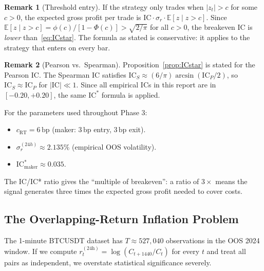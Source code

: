 \documentclass[12pt, a4paper]{article}
\theoremstyle{plain}
\theoremstyle{definition}
\newtheorem{remark}{Remark}[section]
\newcommand{\IC}{\mathrm{IC}}
\newcommand{\E}{\mathbb{E}}
\newcommand{\bp}{\,\mathrm{bp}}
\begin{document}
\begin{remark}[Threshold entry]
  If the strategy only trades when $|z_t| > c$ for some $c > 0$, the expected
  gross profit per trade is $\IC \cdot \sigma_r \cdot \E[z \mid z > c]$.  Since
  $\E[z \mid z > c] = \phi(c)/[1-\Phi(c)] > \sqrt{2/\pi}$ for all $c > 0$,
  the breakeven IC is \emph{lower} than~\eqref{eq:ICstar}.  The formula as
  stated is conservative: it applies to the strategy that enters on every bar.
\end{remark}

\begin{remark}[Pearson vs.\ Spearman]
  Proposition~\ref{prop:ICstar} is stated for the Pearson IC.  The Spearman
  IC satisfies $\IC_S \approx (6/\pi)\arcsin(\IC_P / 2)$, so
  $\IC_S \approx \IC_P$ for $|\IC| \ll 1$.  Since all empirical ICs in this
  report are in $[-0.20, +0.20]$, the same $\IC^*$ formula is applied.
\end{remark}

For the parameters used throughout Phase 3:
\begin{itemize}[noitemsep]
  \item $c_{\mathrm{RT}} = 6\bp$ (maker: $3\bp$ entry, $3\bp$ exit).
  \item $\sigma_r^{(24h)} \approx 2.135\%$ (empirical OOS volatility).
  \item $\IC^*_{\mathrm{maker}} \approx 0.035$.
\end{itemize}

The IC/IC* ratio gives the ``multiple of breakeven'': a ratio of $3\times$
means the signal generates three times the expected gross profit needed
to cover costs.

\subsection{The Overlapping-Return Inflation Problem}
\label{sec:overlap}

The 1-minute BTCUSDT dataset has $T \approx 527{,}040$ observations in the OOS
2024 window.  If we compute $r_t^{(24\text{h})} = \log(C_{t+1440}/C_t)$
for every $t$ and treat all pairs as independent, we overstate statistical
significance severely.
\end{document}

